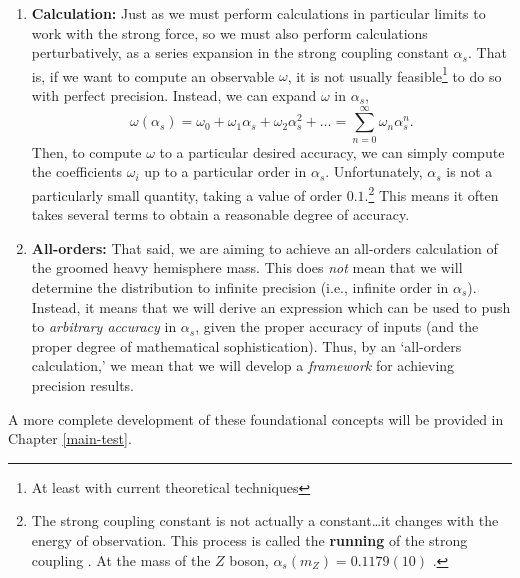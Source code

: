 \documentclass[12pt,twoside,class=../reedthesis, crop=false]{standalone}
\begin{document}
\begin{enumerate}
		\item \textbf{Calculation:} Just as we must perform calculations in particular limits to work with the strong force, so we must also perform calculations perturbatively, as a series expansion in the strong coupling constant $\alpha_s$. That is, if we want to compute an observable $\omega$, it is not usually feasible\footnote{At least with current theoretical techniques} to do so with perfect precision. Instead, we can expand $\omega$ in $\alpha_s$,
		\begin{equation}
			\omega(\alpha_s) = \omega_0 + \omega_1 \alpha_s + \omega_2 \alpha_s^2 + \dots = \sum_{n = 0}^\infty \omega_n \alpha_s^n.
		\end{equation}
		Then, to compute $\omega$ to a particular desired accuracy, we can simply compute the coefficients $\omega_i$ up to a particular order in $\alpha_s$. Unfortunately, $\alpha_s$ is not a particularly small quantity, taking a value of order $0.1$.\footnote{The strong coupling constant is not actually a constant\dots it changes with the energy of observation. This process is called the \textbf{running} of the strong coupling \cite{larkoski_elementary_2019-1}. At the mass of the $Z$ boson, $\alpha_s(m_Z) = 0.1179(10)$ \cite{particle_data_group_review_2020}.} This means it often takes several terms to obtain a reasonable degree of accuracy.

		\item \textbf{All-orders:} That said, we are aiming to achieve an all-orders calculation of the groomed heavy hemisphere mass. This does \textit{not} mean that we will determine the distribution to infinite precision (i.e., infinite order in $\alpha_s$). Instead, it means that we will derive an expression which can be used to push to \textit{arbitrary accuracy} in $\alpha_s$, given the proper accuracy of inputs (and the proper degree of mathematical sophistication). Thus, by an `all-orders calculation,' we mean that we will develop a \textit{framework} for achieving precision results.
	\end{enumerate}
	A more complete development of these foundational concepts will be provided in Chapter \ref{main-test}.
\end{document}
